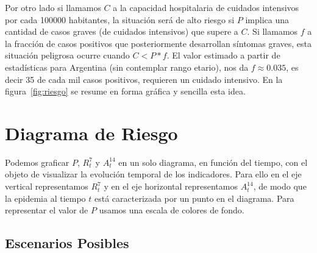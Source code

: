 \documentclass[12pt,a4paper]{article}
\begin{document}
Por otro lado si llamamos $C$ a la capacidad hospitalaria de cuidados intensivos 
por cada 100000 habitantes, la situación será de alto riesgo si $P$ implica una 
cantidad de casos graves (de cuidados intensivos) que supere a $C$.
Si llamamos $f$ a la fracción de casos positivos que posteriormente 
desarrollan síntomas graves, esta situación peligrosa ocurre cuando 
$C < P * f$. El valor estimado a partir de estadísticas para Argentina 
(sin contemplar rango etario), nos da $f\approx 0.035$, es decir 35 de 
cada mil casos positivos, requieren un cuidado intensivo. 
En la figura~\ref{fig:riesgo} se resume en forma gráfica y sencilla esta idea.

\section*{Diagrama de Riesgo}

Podemos graficar $P$,  $R^7_t$ y $A^{14}_t$ en un solo diagrama, en función del tiempo, 
con el objeto de visualizar la evolución temporal de los indicadores. 
Para ello en el eje vertical representamos $R^7_t$ y en el eje horizontal 
representamos $A^{14}_t$, de modo que la epidemia al tiempo $t$ está caracterizada 
por un punto en el diagrama. Para representar el valor de 
$P$ usamos una escala de colores de fondo. 

\subsection*{Escenarios Posibles}
\end{document}
